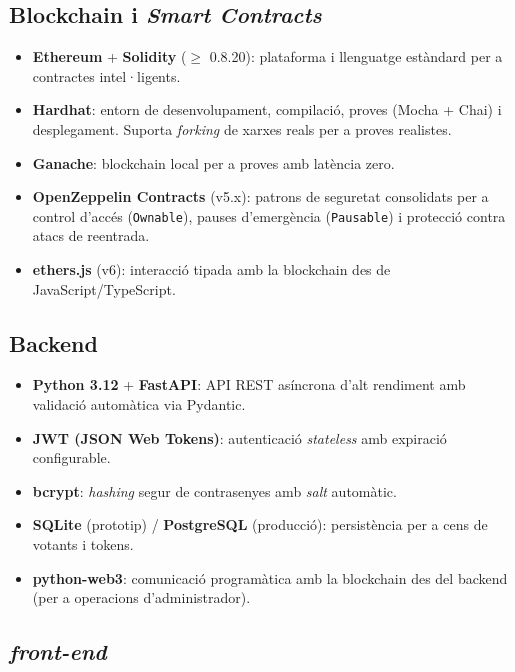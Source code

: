 \documentclass[12pt,a4paper,catalan]{article}
\begin{document}
\subsection{Blockchain i \textit{Smart Contracts}}

\begin{itemize}
    \item \textbf{Ethereum} + \textbf{Solidity} ($\geq$ 0.8.20): plataforma i llenguatge estàndard per a contractes intel·ligents.
    \item \textbf{Hardhat}: entorn de desenvolupament, compilació, proves (Mocha + Chai) i desplegament. Suporta \textit{forking} de xarxes reals per a proves realistes.
    \item \textbf{Ganache}: blockchain local per a proves amb latència zero.
    \item \textbf{OpenZeppelin Contracts} (v5.x): patrons de seguretat consolidats per a control d'accés (\texttt{Ownable}), pauses d'emergència (\texttt{Pausable}) i protecció contra atacs de reentrada.
    \item \textbf{ethers.js} (v6): interacció tipada amb la blockchain des de JavaScript/TypeScript.
\end{itemize}

\subsection{Backend}

\begin{itemize}
    \item \textbf{Python 3.12} + \textbf{FastAPI}: API REST asíncrona d'alt rendiment amb validació automàtica via Pydantic.
    \item \textbf{JWT (JSON Web Tokens)}: autenticació \textit{stateless} amb expiració configurable.
    \item \textbf{bcrypt}: \textit{\textit{hash}ing} segur de contrasenyes amb \textit{salt} automàtic.
    \item \textbf{SQLite} (prototip) / \textbf{PostgreSQL} (producció): persistència per a cens de votants i tokens.
    \item \textbf{python-web3}: comunicació programàtica amb la blockchain des del backend (per a operacions d'administrador).
\end{itemize}

\subsection{\textit{front-end}}
\end{document}
